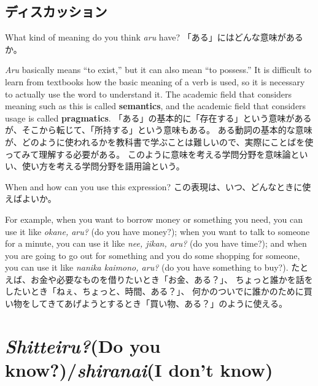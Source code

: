 \documentclass[uplatex,dvipdfmx,b5paper,english,10pt]{jsbook}
\begin{document}
\subsection{ディスカッション}
\fi

\begin{toiquestion}
\ifEnglish
What kind of meaning do you think {\it aru\/} have?
\else
「ある」にはどんな意味があるか。
\fi
\end{toiquestion}
\begin{toianswer}
\ifEnglish
{\it Aru\/} basically means ``to exist,'' but it can also mean ``to possess.''
It is difficult to learn from textbooks how the basic meaning of a verb is used, so it is necessary to actually use the word to understand it.
The academic field that considers meaning such as this is called {\bf semantics\/}, and the academic field that considers usage is called {\bf pragmatics\/}.
\else
「ある」の基本的に「存在する」という意味があるが、そこから転じて、「所持する」という意味もある。
ある動詞の基本的な意味が、どのように使われるかを教科書で学ぶことは難しいので、実際にことばを使ってみて理解する必要がある。
このように意味を考える学問分野を意味論といい、使い方を考える学問分野を語用論という。
\fi
\end{toianswer}

\begin{toiquestion}
\ifEnglish
When and how can you use this expression?
\else
この表現は、いつ、どんなときに使えばよいか。
\fi
\end{toiquestion}
\begin{toianswer}
\ifEnglish
For example, when you want to borrow money or something you need, you can use it like {\it okane, aru?\/} (do you have money?);
when you want to talk to someone for a minute, you can use it like {\it nee, jikan, aru?\/} (do you have time?); and
when you are going to go out for something and you do some shopping for someone, you can use it like {\it nanika kaimono, aru?\/} (do you have something to buy?).
\else
たとえば、お金や必要なものを借りたいとき「お金、ある？」、
ちょっと誰かを話をしたいとき「ねぇ、ちょっと、時間、ある？」、
何かのついでに誰かのために買い物をしてきてあげようとするとき「買い物、ある？」のように使える。
\fi
\end{toianswer}



\ifEnglish
\section{{\it Shitteiru?\/}(Do you know?)/{\it shiranai\/}(I don't know)}
\else
\end{document}
